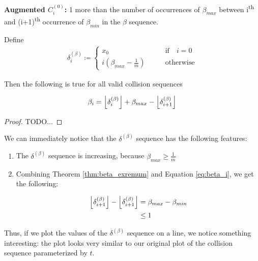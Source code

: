 \begin{definition}
	\textbf{Augmented $C^{(0)}_i$:} 1 more than the number of occurrences of $\beta_{max}$ between i\textsuperscript{th} and (i+1)\textsuperscript{th} occurrence of $\beta_{min}$ in the $\beta$ sequence.
\end{definition}

\begin{theorem}\label{thm:beta_i}
	Define 
	\begin{align}\label{delta_beta}
			\delta^{(\beta)}_i \coloneqq \begin{cases}
				x_0 \qquad &\text{if} \quad i = 0\\
				i (\beta_{max} - \frac{1}{m}) \qquad &\text{otherwise}
			\end{cases}
	\end{align}

	Then the following is true for all valid collision sequences

	\begin{align}\label{eq:beta_i}
		\beta_i = \floor{\delta^{(\beta)}_i} + \beta_{max} - \floor{\delta^{(\beta)}_{i+1}}
	\end{align}
\end{theorem}

\begin{proof}
	TODO...
\end{proof}

We can immediately notice that the $\delta^{(\beta)}$ sequence has the following features:

\begin{enumerate}
	\item The $\delta^{(\beta)}$ sequence is increasing, because $\beta_{max} \ge \frac{1}{m}$
	\item Combining Theorem \ref{thm:beta_exremum} and Equation \ref{eq:beta_i}, we get the following:

		\begin{align}
			\floor{\delta^{(\beta)}_{i+1}} - \floor{\delta^{(\beta)}_{i+1}}& = \beta_{max} - \beta_{min}\\
			& \le 1
		\end{align}
\end{enumerate}

Thus, if we plot the values of the $\delta^{(\beta)}$ sequence on a line, we notice something interesting: the plot looks very similar to our original plot of the collision sequence parameterized by $t$. 


